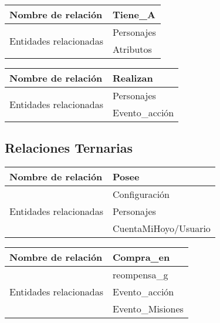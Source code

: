 \documentclass{report}
\begin{document}
\hfill

\begin{center}    
    \begin{tabular}{|p{3cm}|p{5cm}|}
    \hline
    Nombre de relación& Tiene\_A\\ 
    \hline
    \hline
    \multirow{2}{6em}{Entidades relacionadas}& Personajes \\ &Atributos\\ 
    \hline
    \end{tabular}
\end{center}

\hfill

\begin{center}    
    \begin{tabular}{|p{3cm}|p{5cm}|}
    \hline
    Nombre de relación& Realizan\\ 
    \hline
    \hline
    \multirow{2}{6em}{Entidades relacionadas}& Personajes \\ &Evento\_acción\\ 
    \hline
    \end{tabular}
\end{center}

\subsection{Relaciones Ternarias}
\begin{center}    
    \begin{tabular}{|p{3cm}|p{5cm}|}
    \hline
    Nombre de relación& Posee\\ 
    \hline
    \hline
    \multirow{3}{6em}{Entidades relacionadas}& Configuración \\ &Personajes \\ &CuentaMiHoyo/Usuario\\ 
    \hline
    \end{tabular}
\end{center}

\begin{center}    
    \begin{tabular}{|p{3cm}|p{5cm}|}
    \hline
    Nombre de relación& Compra\_en\\ 
    \hline
    \hline
    \multirow{3}{6em}{Entidades relacionadas}& reompensa\_g \\ &Evento\_acción \\ &Evento\_Misiones\\ 
    \hline
    \end{tabular}
\end{center}
\end{document}
